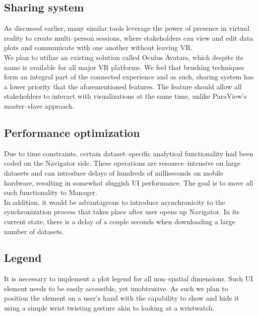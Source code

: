 \documentclass{article}
\begin{document}
\subsection{Sharing system}

As discussed earlier, many similar tools leverage the power of presence in virtual reality to create multi--person sessions, where stakeholders can view and edit data plots and communicate with one another without leaving VR.\\

We plan to utilize an existing solution called Oculus Avatars, which despite its name is available for all major VR platforms.\cite{avatarsdk} We feel that brushing techniques form an integral part of the connected experience and as such, sharing system has a lower priority that the aforementioned features. The feature should allow all stakeholders to interact with visualizations at the same time, unlike ParaView's master--slave approach.

\subsection{Performance optimization}

Due to time constraints, certain dataset--specific analytical functionality had been coded on the Navigator side. These operations are resource--intensive on large datasets and can introduce delays of hundreds of milliseconds on mobile hardware, resulting in somewhat sluggish UI performance. The goal is to move all such functionality to Manager.\\

In addition, it would be advantageous to introduce asynchronicity to the synchronization process that takes place after user opens up Navigator. In its current state, there is a delay of a couple seconds when downloading a large number of datasets.

\subsection{Legend}

It is necessary to implement a plot legend for all non--spatial dimensions. Such UI element needs to be easily accessible, yet unobtrusive. As such we plan to position the element on a user's hand with the capability to show and hide it using a simple wrist twisting gesture akin to looking at a wristwatch.
\end{document}
